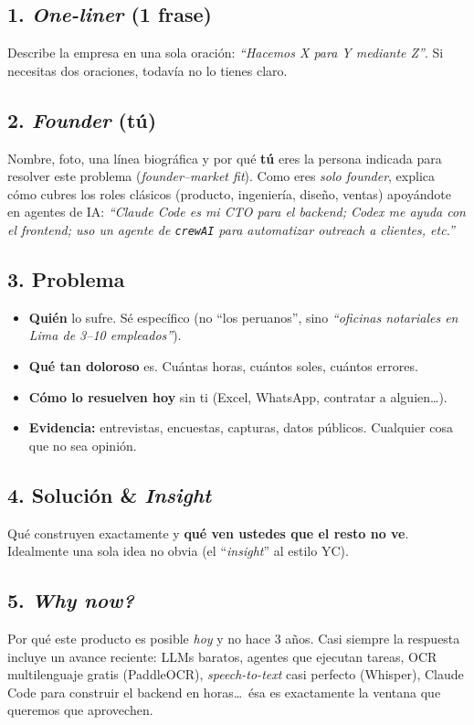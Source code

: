 \documentclass[11pt,a4paper]{article}
\begin{document}
\subsection{1. \emph{One-liner} (1 frase)}
Describe la empresa en una sola oraci\'on: \emph{``Hacemos X para Y mediante Z''}.
Si necesitas dos oraciones, todav\'ia no lo tienes claro.

\subsection{2. \emph{Founder} (t\'u)}
Nombre, foto, una l\'inea biogr\'afica y por qu\'e \textbf{t\'u} eres la persona
indicada para resolver este problema (\emph{founder--market fit}).
Como eres \emph{solo founder}, explica c\'omo cubres los roles cl\'asicos
(producto, ingenier\'ia, dise\~no, ventas) apoy\'andote en agentes de IA:
\emph{``Claude Code es mi CTO para el backend; Codex me ayuda con el frontend;
uso un agente de \texttt{crewAI} para automatizar outreach a clientes, etc.''}

\subsection{3. Problema}
\begin{itemize}[leftmargin=1.2em,itemsep=2pt,topsep=2pt]
  \item \textbf{Qui\'en} lo sufre. S\'e espec\'ifico (no ``los peruanos'', sino
        \emph{``oficinas notariales en Lima de 3--10 empleados''}).
  \item \textbf{Qu\'e tan doloroso} es. Cu\'antas horas, cu\'antos soles, cu\'antos errores.
  \item \textbf{C\'omo lo resuelven hoy} sin ti (Excel, WhatsApp, contratar a alguien\ldots).
  \item \textbf{Evidencia:} entrevistas, encuestas, capturas, datos p\'ublicos.
        Cualquier cosa que no sea opini\'on.
\end{itemize}

\subsection{4. Soluci\'on \& \emph{Insight}}
Qu\'e construyen exactamente y \textbf{qu\'e ven ustedes que el resto no ve}.
Idealmente una sola idea no obvia (el ``\emph{insight}'' al estilo YC).

\subsection{5. \emph{Why now?}}
Por qu\'e este producto es posible \emph{hoy} y no hace 3 a\~nos.
Casi siempre la respuesta incluye un avance reciente: LLMs baratos,
agentes que ejecutan tareas, OCR multilenguaje gratis (PaddleOCR),
\emph{speech-to-text} casi perfecto (Whisper), Claude Code para construir
el backend en horas\ldots\ \'esa es exactamente la ventana que queremos
que aprovechen.
\end{document}
